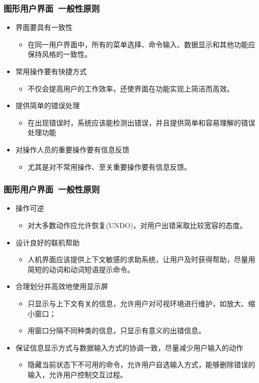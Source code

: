 \documentclass{beamer}
\begin{document}
\begin{frame}
	\frametitle{图形用户界面~{\small 一般性原则}}
	\beamertemplatetransparentcovereddynamicmedium
	\begin{itemize}[<+->]
		\item 界面要具有一致性
		\begin{itemize}
			\item 在同一用户界面中，所有的菜单选择、命令输入、数据显示和其他功能应保持风格的一致性。
		\end{itemize}
		\item 常用操作要有快捷方式
		\begin{itemize}
			\item 不仅会提高用户的工作效率，还使界面在功能实现上简洁而高效。
		\end{itemize}
		\item 提供简单的错误处理
		\begin{itemize}
			\item 在出现错误时，系统应该能检测出错误，并且提供简单和容易理解的错误处理功能
		\end{itemize}
		\item 对操作人员的重要操作要有信息反馈
		\begin{itemize}
			\item 尤其是对不常用操作、至关重要操作要有信息反馈。
		\end{itemize}
	\end{itemize}
\end{frame}

\begin{frame}
	\frametitle{图形用户界面~{\small 一般性原则}}
	\beamertemplatetransparentcovereddynamicmedium
	\begin{itemize}[<+->]
		\item 操作可逆
		\begin{itemize}
			\item 对大多数动作应允许恢复(UNDO)，对用户出错采取比较宽容的态度。
		\end{itemize}
		\item 设计良好的联机帮助
		\begin{itemize}
			\item 人机界面应该提供上下文敏感的求助系统，让用户及时获得帮助，尽量用简短的动词和动词短语提示命令。
		\end{itemize}
		\item 合理划分并高效地使用显示屏
		\begin{itemize}
			\item 只显示与上下文有关的信息，允许用户对可视环境进行维护，如放大、缩小窗口；
			\item 用窗口分隔不同种类的信息，只显示有意义的出错信息。
		\end{itemize}
		\item 保证信息显示方式与数据输入方式的协调一致，尽量减少用户输入的动作
		\begin{itemize}
			\item 隐藏当前状态下不可用的命令，允许用户自选输入方式，能够删除错误的输入，允许用户控制交互过程。
		\end{itemize}
	\end{itemize}
\end{frame}
\end{document}

